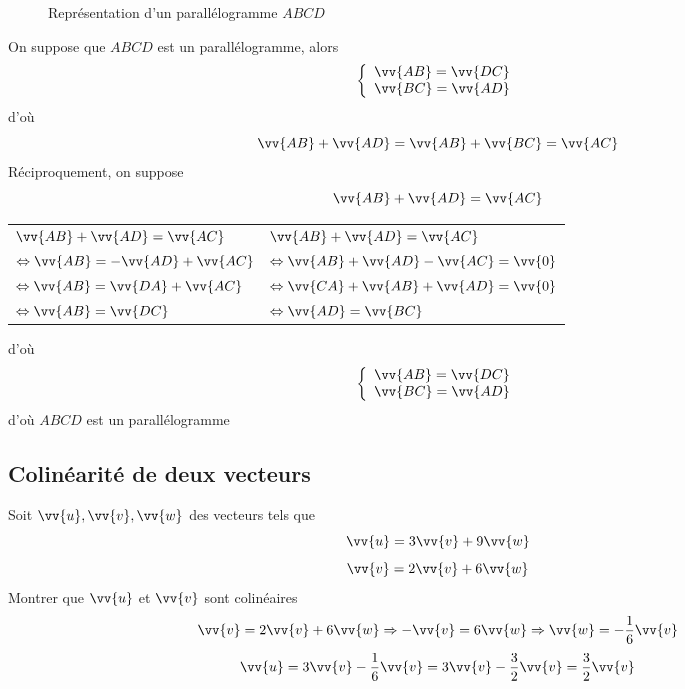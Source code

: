 \begin{figure}[H]
\centering
{}
\caption{Représentation d'un parallélogramme $ABCD$}
\end{figure}

\begin{preuve}
On suppose que $ABCD$ est un parallélogramme, alors 
$$\left\{ \begin{array}{l}  \vv{AB} = \vv{DC}\\ \vv{BC} = \vv{AD} \end{array}\right.$$
d'où $$\vv{AB} + \vv{AD} = \vv{AB} + \vv{BC} = \vv{AC}$$
Réciproquement, on suppose 
$$\vv{AB} + \vv{AD} = \vv{AC}$$
\begin{tabularx}{\linewidth}{X X}
$\vv{AB} + \vv{AD} = \vv{AC}$ & $\vv{AB} + \vv{AD} = \vv{AC}$\\
$\Leftrightarrow \vv{AB} = -\vv{AD} + \vv{AC}$ & $\Leftrightarrow \vv{AB} + \vv{AD} - \vv{AC} = \vv{0}$\\
$\Leftrightarrow \vv{AB} = \vv{DA} + \vv{AC}$ & $\Leftrightarrow \vv{CA} + \vv{AB} + \vv{AD} = \vv{0}$\\
$\Leftrightarrow \vv{AB} = \vv{DC}$ & $\Leftrightarrow \vv{AD} = \vv{BC}$\\
\end{tabularx}
d'où 
$$\left\{ \begin{array}{l}  \vv{AB} = \vv{DC}\\ \vv{BC} = \vv{AD} \end{array}\right.$$
d'où $ABCD$ est un parallélogramme
\end{preuve}
\subsection{Colinéarité de deux vecteurs}
\newline

\begin{exemple}
Soit $\vv{u}, \vv{v}, \vv{w}$ des vecteurs tels que 
$$\vv{u} = 3\vv{v} + 9 \vv{w}$$
$$\vv{v} = 2\vv{v} + 6 \vv{w}$$
Montrer que $\vv{u}$ et $\vv{v}$ sont colinéaires
$$\vv{v} = 2 \vv{v} + 6 \vv{w} \Rightarrow -\vv{v} = 6 \vv{w} \Rightarrow \vv{w} = -\dfrac{1}{6} \vv{v}$$
$$\vv{u} = 3\vv{v} - \dfrac{1}{6} \vv{v} = 3\vv{v} - \dfrac{3}{2}\vv{v} = \dfrac{3}{2}\vv{v}$$
\end{exemple}
\newline

